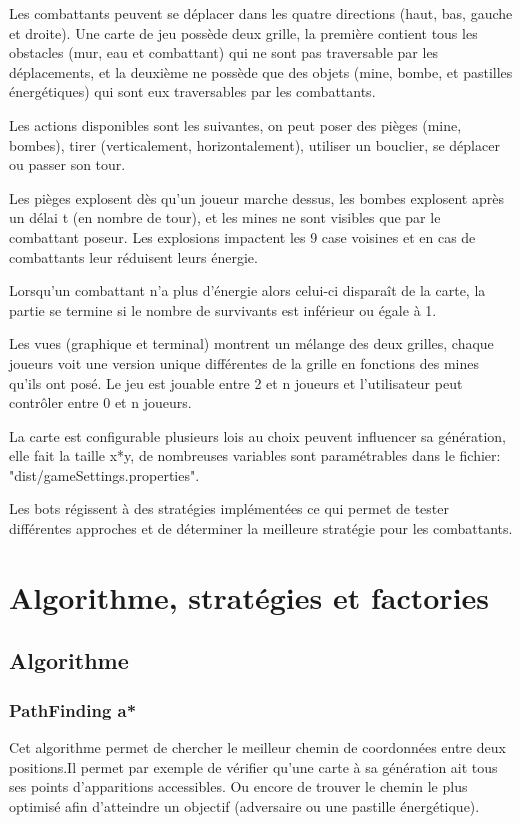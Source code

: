 \documentclass[a4paper,12pt]{article}
\begin{document}
	Les combattants peuvent se déplacer dans les quatre directions (haut, bas, gauche et droite).
	Une carte de jeu possède deux grille, la première contient tous les obstacles (mur, eau et combattant) qui ne sont pas traversable par les déplacements, et la deuxième ne possède que des objets (mine, bombe, et pastilles énergétiques) qui sont eux traversables par les combattants.
	
	Les actions disponibles sont les suivantes, on peut poser des pièges (mine, bombes), tirer (verticalement, horizontalement), utiliser un bouclier, se déplacer ou passer son tour.
	
	Les pièges explosent dès qu'un joueur marche dessus, les bombes explosent après un délai t (en nombre de tour), et les mines ne sont visibles que par le combattant poseur. Les explosions impactent les 9 case voisines et en cas de combattants leur réduisent leurs énergie.
	
	Lorsqu'un combattant n'a plus d’énergie alors celui-ci disparaît de la carte, la partie se termine si le nombre de survivants est inférieur ou égale à 1.
	
	Les vues (graphique et terminal) montrent un mélange des deux grilles, chaque joueurs voit une version unique différentes de la grille en fonctions des mines qu'ils ont posé. Le jeu est jouable entre 2 et n joueurs et l'utilisateur peut contrôler entre 0 et n joueurs. 
	
	La carte est configurable plusieurs lois au choix peuvent influencer sa génération, elle fait la taille x*y, de nombreuses variables sont paramétrables dans le fichier: "dist/gameSettings.properties".
	
	Les bots régissent à des stratégies implémentées ce qui permet de tester différentes approches et de déterminer la meilleure stratégie pour les combattants.
	
	\section{Algorithme, stratégies et factories}
	
	\subsection{Algorithme}
	\subsubsection{PathFinding a*}
	\label{sec:PathFinding}
	Cet algorithme permet de chercher le meilleur chemin de coordonnées entre deux positions.Il permet par exemple de vérifier qu'une carte à sa génération ait tous ses points d'apparitions accessibles. Ou encore de trouver le chemin le plus optimisé afin d'atteindre un objectif (adversaire ou une pastille énergétique).
	
\end{document}
